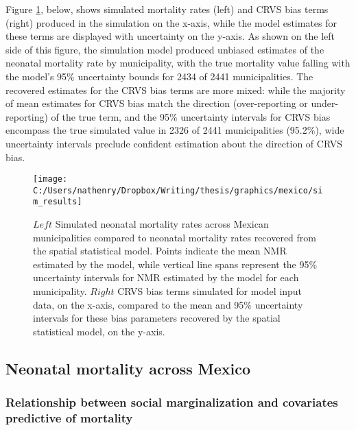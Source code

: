 \documentclass[
]{article}
\begin{document}
Figure \ref{fig:sim-results}, below, shows simulated mortality rates (left) and CRVS bias terms (right) produced in the simulation on the x-axis, while the model estimates for these terms are displayed with uncertainty on the y-axis. As shown on the left side of this figure, the simulation model produced unbiased estimates of the neonatal mortality rate by municipality, with the true mortality value falling with the model's 95\% uncertainty bounds for 2434 of 2441 municipalities. The recovered estimates for the CRVS bias terms are more mixed: while the majority of mean estimates for CRVS bias match the direction (over-reporting or under-reporting) of the true term, and the 95\% uncertainty intervals for CRVS bias encompass the true simulated value in 2326 of 2441 municipalities (95.2\%), wide uncertainty intervals preclude confident estimation about the direction of CRVS bias.

\begin{figure}[!ht]

{\centering \texttt{[image: C:/Users/nathenry/Dropbox/Writing/thesis/graphics/mexico/sim\_results]} 

}

\caption{\(Left\) Simulated neonatal mortality rates across Mexican municipalities  compared to neonatal mortality rates recovered from the spatial statistical model. Points indicate the mean NMR estimated by the model, while vertical line spans represent the 95\% uncertainty intervals for NMR estimated by the model for each municipality. \(Right\) CRVS bias terms simulated for model input data, on the x-axis, compared to the mean and 95\% uncertainty intervals for these bias parameters recovered by the spatial statistical model, on the y-axis.}\label{fig:sim-results}
\end{figure}

\hypertarget{neonatal-mortality-across-mexico}{%
\subsection{Neonatal mortality across Mexico}\label{neonatal-mortality-across-mexico}}

\hypertarget{relationship-between-social-marginalization-and-covariates-predictive-of-mortality}{%
\subsubsection{Relationship between social marginalization and covariates predictive of mortality}\label{relationship-between-social-marginalization-and-covariates-predictive-of-mortality}}
\end{document}
